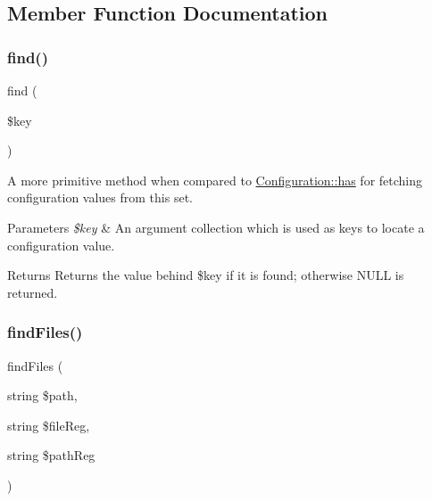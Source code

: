 \subsection{Member Function Documentation}
\mbox{\label{class_lora_1_1_configuration_ab0af62bde4b0a5a69518020bec0b5cbf}} 
\subsubsection{\texorpdfstring{find()}{find()}}
{\footnotesize\ttfamily find (\begin{DoxyParamCaption}\item[{}]{\$key }\end{DoxyParamCaption})}

A more primitive method when compared to \hyperlink{class_lora_1_1_configuration_a4eb96d4eee36a1778069e0c2e2ba24c1}{Configuration\+::has} for fetching configuration values from this set. 
\begin{DoxyParams}{Parameters}
{\em \$key} & An argument collection which is used as keys to locate a configuration value. \\
\hline
\end{DoxyParams}
\begin{DoxyReturn}{Returns}
Returns the value behind \$key if it is found; otherwise N\+U\+LL is returned. 
\end{DoxyReturn}

\mbox{\label{class_lora_1_1_configuration_a1c83c8aa614a13481acfdd1917fa6fb1}} 
\subsubsection{\texorpdfstring{find\+Files()}{findFiles()}}
{\footnotesize\ttfamily find\+Files (\begin{DoxyParamCaption}\item[{string}]{\$path,  }\item[{string}]{\$file\+Reg,  }\item[{string}]{\$path\+Reg }\end{DoxyParamCaption})\hspace{0.3cm}{\ttfamily [private]}}

